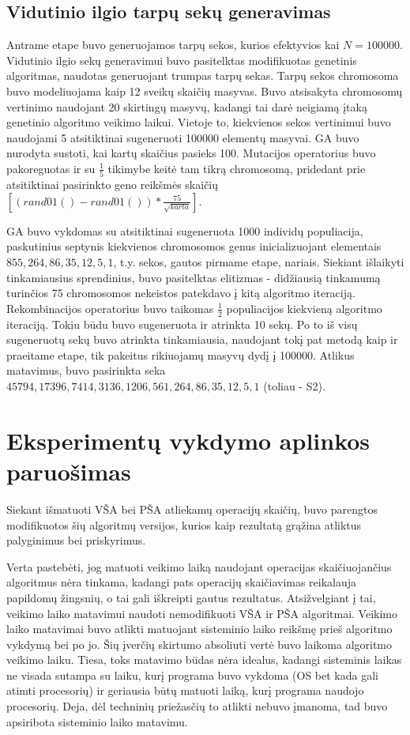 \documentclass{VUMIFInfKursinis}
\begin{document}
\subsection{Vidutinio ilgio tarpų sekų generavimas}
Antrame etape buvo generuojamos tarpų sekos, kurios efektyvios kai $N=100000$.
Vidutinio ilgio sekų generavimui buvo pasitelktas modifikuotas genetinis algoritmas, naudotas generuojant trumpas tarpų sekas.
Tarpų sekos chromosoma buvo modeliuojama kaip 12 sveikų skaičių masyvas.
Buvo atsisakyta chromosomų vertinimo naudojant 20 skirtingų masyvų, kadangi tai darė neigiamą įtaką genetinio algoritmo veikimo laikui.
Vietoje to, kiekvienos sekos vertinimui buvo naudojami 5 atsitiktinai sugeneruoti 100000 elementų masyvai.
GA buvo nurodyta sustoti, kai kartų skaičius pasieks 100.
Mutacijos operatorius buvo pakoreguotas ir su $\frac{1}{5}$ tikimybe keitė tam tikrą chromosomą,
pridedant prie atsitiktinai pasirinkto geno reikšmės skaičių $\left[(rand01()-rand01())*\frac{75}{\sqrt{karta}}\right]$.

GA buvo vykdomas su atsitiktinai sugeneruota 1000 individų populiacija,
paskutinius septynis kiekvienos chromosomos genus inicializuojant elementais $855, 264, 86, 35, 12, 5, 1$, t.y. sekos, gautos pirmame etape, nariais.
Siekiant išlaikyti tinkamiausius sprendinius, buvo pasitelktas elitizmas - didžiausią tinkamumą turinčios 75 chromosomos nekeistos
patekdavo į kitą algoritmo iteraciją.
Rekombinacijos operatorius buvo taikomas $\frac{1}{2}$ populiacijos kiekvieną algoritmo iteraciją.
Tokiu būdu buvo sugeneruota ir atrinkta 10 sekų.
Po to iš visų sugeneruotų sekų buvo atrinkta tinkamiausia, naudojant tokį pat metodą kaip ir praeitame etape, tik pakeitus rikiuojamų masyvų dydį į 100000.
Atlikus matavimus, buvo pasirinkta seka $45794, 17396, 7414, 3136, 1206, 561, 264, 86, 35, 12, 5, 1$ (toliau - S2).


\section{Eksperimentų vykdymo aplinkos paruošimas}

Siekant išmatuoti VŠA bei PŠA atliekamų operacijų skaičių,
buvo parengtos modifikuotos šių algoritmų versijos, kurios kaip rezultatą grąžina atliktus palyginimus bei priskyrimus.

Verta pastebėti, jog matuoti veikimo laiką naudojant operacijas skaičiuojančius algoritmus nėra tinkama,
kadangi pats operacijų skaičiavimas reikalauja papildomų žingsnių, o tai gali iškreipti gautus rezultatus.
Atsižvelgiant į tai, veikimo laiko matavimui naudoti nemodifikuoti VŠA ir PŠA algoritmai.
Veikimo laiko matavimai buvo atlikti matuojant sisteminio laiko reikšmę prieš algoritmo vykdymą bei po jo.
Šių įverčių skirtumo absoliuti vertė buvo laikoma algoritmo veikimo laiku.
Tiesa, toks matavimo būdas nėra idealus, kadangi sisteminis laikas ne visada sutampa su laiku, kurį programa buvo vykdoma (OS bet kada gali atimti procesorių)
ir geriausia būtų matuoti laiką, kurį programa naudojo procesorių. Deja, dėl techninių priežasčių to atlikti nebuvo įmanoma, tad buvo apsiribota sisteminio laiko matavimu.
\end{document}

